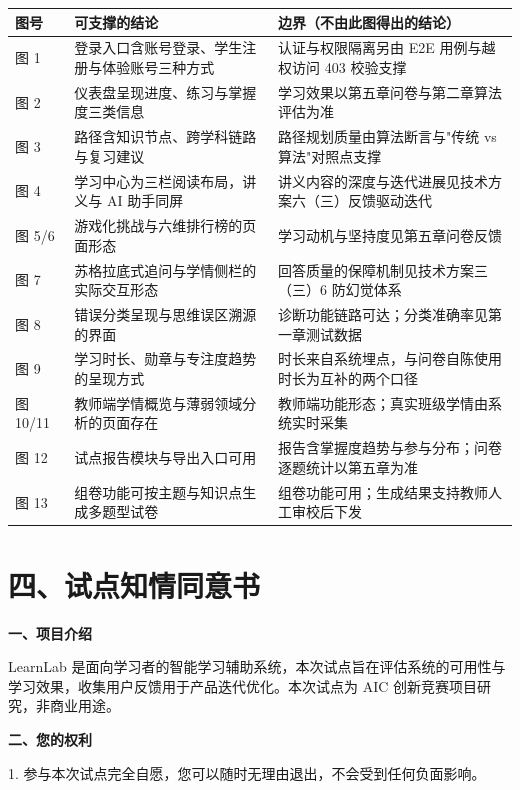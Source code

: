 \documentclass[zihao=-4,a4paper,UTF8,fontset=windows]{ctexart}
\begin{document}
\par\noindent\begin{tabular}{|p{1.6cm}|p{4.8cm}|p{6.6cm}|}
\hline
\textbf{图号} & \textbf{可支撑的结论} & \textbf{边界（不由此图得出的结论）} \\ \hline
图 1 & 登录入口含账号登录、学生注册与体验账号三种方式 & 认证与权限隔离另由 E2E 用例与越权访问 403 校验支撑 \\ \hline
图 2 & 仪表盘呈现进度、练习与掌握度三类信息 & 学习效果以第五章问卷与第二章算法评估为准 \\ \hline
图 3 & 路径含知识节点、跨学科链路与复习建议 & 路径规划质量由算法断言与"传统 vs 算法"对照点支撑 \\ \hline
图 4 & 学习中心为三栏阅读布局，讲义与 AI 助手同屏 & 讲义内容的深度与迭代进展见技术方案六（三）反馈驱动迭代 \\ \hline
图 5/6 & 游戏化挑战与六维排行榜的页面形态 & 学习动机与坚持度见第五章问卷反馈 \\ \hline
图 7 & 苏格拉底式追问与学情侧栏的实际交互形态 & 回答质量的保障机制见技术方案三（三）6 防幻觉体系 \\ \hline
图 8 & 错误分类呈现与思维误区溯源的界面 & 诊断功能链路可达；分类准确率见第一章测试数据 \\ \hline
图 9 & 学习时长、勋章与专注度趋势的呈现方式 & 时长来自系统埋点，与问卷自陈使用时长为互补的两个口径 \\ \hline
图 10/11 & 教师端学情概览与薄弱领域分析的页面存在 & 教师端功能形态；真实班级学情由系统实时采集 \\ \hline
图 12 & 试点报告模块与导出入口可用 & 报告含掌握度趋势与参与分布；问卷逐题统计以第五章为准 \\ \hline
图 13 & 组卷功能可按主题与知识点生成多题型试卷 & 组卷功能可用；生成结果支持教师人工审校后下发 \\ \hline
\end{tabular}\par

\section{四、试点知情同意书}

\textbf{一、项目介绍}

LearnLab 是面向学习者的智能学习辅助系统，本次试点旨在评估系统的可用性与学习效果，收集用户反馈用于产品迭代优化。本次试点为 AIC 创新竞赛项目研究，非商业用途。

\textbf{二、您的权利}

1. 参与本次试点完全自愿，您可以随时无理由退出，不会受到任何负面影响。
\end{document}
